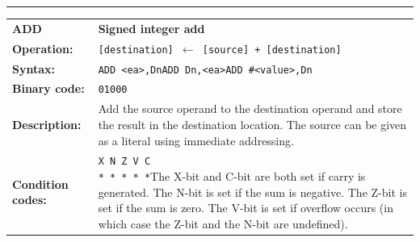 \documentclass[]{article}
\begin{document}
\begin{appendices}
\noindent\rule{\textwidth}{1pt}\newline %
\setlength\extrarowheight{5pt} %
\begin{tabularx}{\textwidth}{lL}
  {\Large \textbf{ADD}} 	& {\Large \textbf{Signed integer add}}\\
  \textbf{Operation:} 		& \texttt{[destination] $\leftarrow$ [source] + [destination]}\\
  \textbf{Syntax:}  		& \texttt{ADD <ea>,Dn}\newline\texttt{ADD Dn,<ea>}\newline\texttt{ADD \#<value>,Dn}\\
  \textbf{Binary code:} 	& \texttt{01000}\\
  \textbf{Description:}  	& Add the source operand to the destination operand and store the
result in the destination location. The source can be given as a literal using immediate addressing.\\
  \textbf{Condition codes:} & \texttt{X N Z V C\newline * * * * *}\newline\newline The X-bit and C-bit are both set if carry is generated. The N-bit is set if the sum is negative. The Z-bit is set if the sum is zero. The V-bit is set if overflow occurs (in which case the Z-bit and the N-bit are undefined).\\
\end{tabularx}
\newline


\end{appendices}
\end{document}
